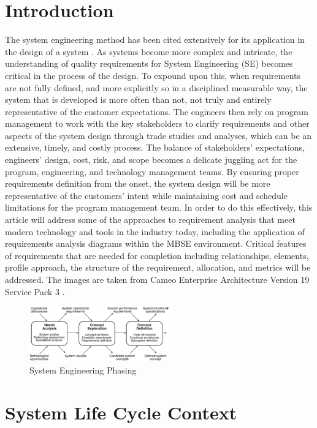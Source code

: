 \documentclass[num-refs]{wiley-article}
\begin{document}
\section{Introduction}
\label{Introduction}
The system engineering method has been cited extensively for its application in the design of a system \cite{Friedenthal2008}. As systems become more complex and intricate, the understanding of quality requirements for System Engineering (SE) becomes critical in the process of the design. To expound upon this, when requirements are not fully defined, and more explicitly so in a disciplined measurable way, the system that is developed is more often than not, not truly and entirely representative of the customer expectations. The engineers then rely on program management to work with the key stakeholders to clarify requirements and other aspects of the system design through trade studies and analyses, which can be an extensive, timely, and costly process. The balance of stakeholders' expectations, engineers' design, cost, risk, and scope becomes a delicate juggling act for the program, engineering, and technology management teams. By ensuring proper requirements definition from the onset, the system design will be more representative of the customers' intent while maintaining cost and schedule limitations for the program management team. In order to do this effectively, this article will address some of the approaches to requirement analysis that meet modern technology and tools in the industry today, including the application of requirements analysis diagrams within the MBSE environment. Critical features of requirements that are needed for completion including relationships, elements, profile approach, the structure of the requirement, allocation, and metrics will be addressed. The images are taken from Cameo Enterprise Architecture Version 19 Service Pack 3 \cite{Morkevicius2014}.

\begin{figure}
\centering
\includegraphics[width=6cm]{Images/SystemEngineeringPhasing.png}
\caption{System Engineering Phasing \cite{Kossiakoff2011}}
\label{fig1}
\end{figure}

\section{System Life Cycle Context}
\label{System Life Cycle Context}
\end{document}
